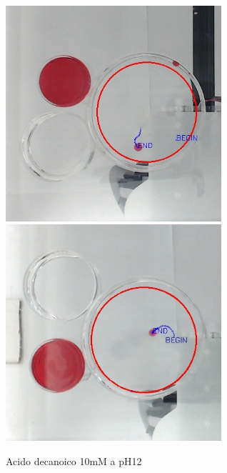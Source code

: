 \begin{figure}[h]
	\centering
   		{\includegraphics[width=8cm]{immagini/10mMpH12-2.jpg}}
 	\hspace{2mm}   	
		{\includegraphics[width=8cm]{immagini/10mMpH12-1.png}}
	\caption{Acido decanoico 10mM a pH12}
\end{figure}   
